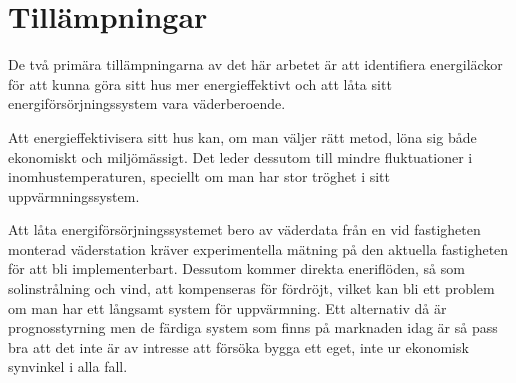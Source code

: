 \section{Tillämpningar}

De två primära tillämpningarna av det här arbetet är att identifiera energiläckor för att kunna göra sitt hus mer energieffektivt och att låta sitt energiförsörjningssystem vara väderberoende.

Att energieffektivisera sitt hus kan, om man väljer rätt metod, löna sig både ekonomiskt och miljömässigt. Det leder dessutom till mindre fluktuationer i inomhustemperaturen, speciellt om man har stor tröghet i sitt uppvärmningssystem.

Att låta energiförsörjningssystemet bero av väderdata från en vid fastigheten monterad väderstation kräver experimentella mätning på den aktuella fastigheten för att bli implementerbart.
Dessutom kommer direkta eneriflöden, så som solinstrålning och vind, att kompenseras för fördröjt, vilket kan bli ett problem om man har ett långsamt system för uppvärmning. Ett alternativ då är prognosstyrning men de färdiga system som finns på marknaden idag är så pass bra att det inte är av intresse att försöka bygga ett eget, inte ur ekonomisk synvinkel i alla fall.
